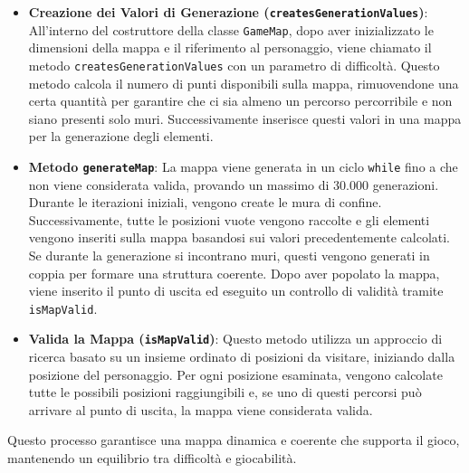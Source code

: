 \documentclass[12pt, letterpaper]{article}
\begin{document}
            \begin{itemize}
                \item \textbf{Creazione dei Valori di Generazione (\texttt{createsGenerationValues})}: All'interno del costruttore della classe \texttt{GameMap}, dopo aver inizializzato le dimensioni della mappa e il riferimento al personaggio, viene chiamato il metodo \texttt{createsGenerationValues} con un parametro di difficoltà. Questo metodo calcola il numero di punti disponibili sulla mappa, rimuovendone una certa quantità per garantire che ci sia almeno un percorso percorribile e non siano presenti solo muri. Successivamente inserisce questi valori in una mappa per la generazione degli elementi.
                \item \textbf{Metodo \texttt{generateMap}}: La mappa viene generata in un ciclo \texttt{while} fino a che non viene considerata valida, provando un massimo di 30.000 generazioni. Durante le iterazioni iniziali, vengono create le mura di confine. Successivamente, tutte le posizioni vuote vengono raccolte e gli elementi vengono inseriti sulla mappa basandosi sui valori precedentemente calcolati. Se durante la generazione si incontrano muri, questi vengono generati in coppia per formare una struttura coerente. Dopo aver popolato la mappa, viene inserito il punto di uscita ed eseguito un controllo di validità tramite \texttt{isMapValid}.
                \item \textbf{Valida la Mappa (\texttt{isMapValid})}: Questo metodo utilizza un approccio di ricerca basato su un insieme ordinato di posizioni da visitare, iniziando dalla posizione del personaggio. Per ogni posizione esaminata, vengono calcolate tutte le possibili posizioni raggiungibili e, se uno di questi percorsi può arrivare al punto di uscita, la mappa viene considerata valida.
            \end{itemize}
            Questo processo garantisce una mappa dinamica e coerente che supporta il gioco, mantenendo un equilibrio tra difficoltà e giocabilità.
\end{document}
